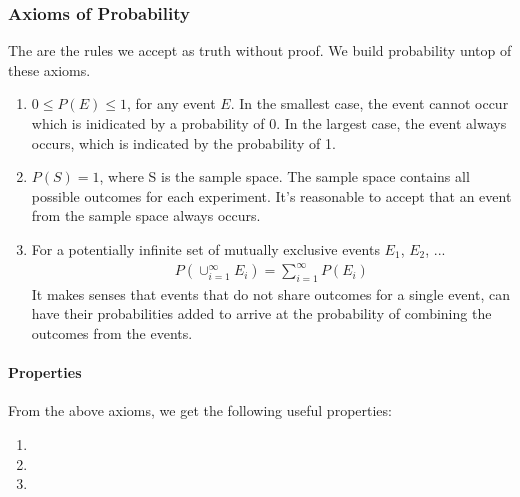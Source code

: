 \subsubsection{Axioms of Probability}
The are the rules we accept as truth without proof. We build probability untop
of these axioms.

\begin{enumerate}
	\item $0 \le P(E) \le 1$, for any event $E$. In the smallest case, the event
		cannot occur which is inidicated by a probability of 0. In the largest case,
		the event always occurs, which is indicated by the probability of 1.
	\item $P(S) = 1$, where S is the sample space. The sample space contains all
		possible outcomes for each experiment. It's reasonable to accept that an
		event from the sample space always occurs.
	\item For a potentially infinite set of mutually exclusive events $E_1$,
		$E_2$, ... 
		\begin{equation*} \begin{split}
			P( \cup_{i=1}^\infty E_i ) = \sum_{i=1}^\infty P(E_i)
		\end{split} \end{equation*}
		It makes senses that events that do not share outcomes for a single event,
		can have their probabilities added to arrive at the probability of combining
		the outcomes from the events.
\end{enumerate}

\paragraph{Properties} From the above axioms, we get the following useful
properties:
\begin{enumerate}
	\item 
	\item 
	\item 
\end{enumerate}

\begin{equation*} \begin{split}
\end{split} \end{equation*}

